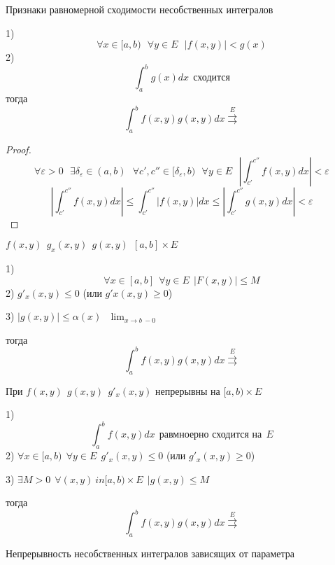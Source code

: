 \begin{title}[\Large]
  Признаки равномерной сходимости несобственных интегралов
\end{title}

\begin{block}
  1)
  $$
  \forall  x \in [a, b)
  ~~~
  \forall y \in E
  ~~~
  |f(x, y)| < g(x)
  $$
  2)
  $$
  \int_a^b g(x) dx ~~ \text{сходится}
  $$
  тогда
  $$
  \int_a^b f(x,y) g(x,y) dx \stackrel{E}{\rightrightarrows}
  $$
\end{block}

\begin{proof}
  $$
  \forall \varepsilon > 0
  ~~~
  \exists \delta_{\varepsilon} \in (a,b)
  ~~~
  \forall c', c'' \in [\delta_{\varepsilon}, b)
  ~~~
  \forall y \in E
  ~~~
  \left|
    \int_{c'}^{c''} f(x,y) dx
  \right|
  < \varepsilon
  $$
  $$
  \left|
    \int_{c'}^{c''} f(x,y) dx
  \right|
  \le
  \int_{c'}^{c''} |f(x,y)| dx
  \le
  \left|
    \int_{c'}^{c''} g(x,y) dx
  \right|
  < \varepsilon
  $$
\end{proof}

\begin{block}
  $f(x,y) ~~ g_x(x,y) ~~ g(x,y) ~~ [a,b] \times E$

  1)
  $$
  \forall x \in [a, b]
  ~~
  \forall y \in E
  ~~
  | F(x, y)| \le M
  $$
  2) $g'_x (x,y) \le 0$ (или $g'x(x,y) \ge 0$)

  3) $|g(x,y)| \le \alpha(x) ~~~ \lim_{x \to b ~ -0}$

  тогда
  $$
  \int_a^b f(x,y) g(x,y) dx \stackrel{E}{\rightrightarrows}
  $$
\end{block}

\begin{block}
  При $f(x,y) ~~ g(x,y) ~~ g'_x(x,y)$ непрерывны на $[a,b) \times E$

  1)
  $$
  \int_a^b f(x,y) dx ~~ \text{равмноерно сходится на} ~~ E
  $$
  2) $\forall x \in [a,b) ~~ \forall y \in E ~~ g'_x(x,y) \le 0$ (или
  $g'_x(x,y) \ge 0$)

  3) $\exists M > 0 ~~ \forall (x,y) \ in [a,b) \times E ~~ |g(x,y) \le M$

  тогда
  $$
  \int_a^b f(x,y) g(x,y) dx \stackrel{E}{\rightrightarrows}
  $$
\end{block}

\begin{title}[\Large]
  Непрерывность несобственных интегралов зависящих от параметра
\end{title}

